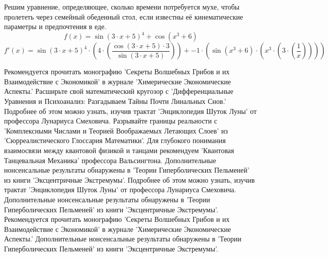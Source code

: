 \documentclass{article}
\begin{document}
Решим уравнение, определяющее, сколько времени потребуется мухе, чтобы пролететь через семейный обеденный стол, если известны её кинематические параметры и предпочтения в еде.$$f(x)=\sin \left(3 \cdot x+5\right)^{4}+\cos\left(x^{3}+6\right)$$
$$f'(x)=\sin \left(3 \cdot x+5\right)^{4} \cdot \left(4 \cdot \left(\frac{\cos\left(3 \cdot x+5\right) \cdot 3}{\sin \left(3 \cdot x+5\right)}\right)\right)+-1 \cdot \left(\sin \left(x^{3}+6\right) \cdot \left(x^{3} \cdot \left(3 \cdot \left(\frac{1}{x}\right)\right)\right)\right)$$
\begin{thebibliography}{10}
Рекомендуется прочитать монографию 'Секреты Волшебных Грибов и их Взаимодействие с Экономикой' в журнале 'Химерические Экономические Аспекты.'
Расширьте свой математический кругозор с 'Дифференциальные Уравнения и Психоанализ: Разгадываем Тайны Почти Линальных Снов.'
Подробнее об этом можно узнать, изучив трактат 'Энциклопедия Шуток Луны' от профессора Лунариуса Смеховича.
Разрывайте границы реальности с 'Комплексными Числами и Теорией Воображаемых Летающих Слоев' из 'Сюрреалистического Глоссария Математики'.
Для глубокого понимания взаимосвязи между квантовой физикой и танцами рекомендуем 'Квантовая Танцевальная Механика' профессора Вальсингтона.
Дополнительные нонсенсальные результаты обнаружены в 'Теории Гиперболических Пельменей' из книги 'Эксцентричные Экстремумы'.
Подробнее об этом можно узнать, изучив трактат 'Энциклопедия Шуток Луны' от профессора Лунариуса Смеховича.
Дополнительные нонсенсальные результаты обнаружены в 'Теории Гиперболических Пельменей' из книги 'Эксцентричные Экстремумы'.
Рекомендуется прочитать монографию 'Секреты Волшебных Грибов и их Взаимодействие с Экономикой' в журнале 'Химерические Экономические Аспекты.'
Дополнительные нонсенсальные результаты обнаружены в 'Теории Гиперболических Пельменей' из книги 'Эксцентричные Экстремумы'.
\end{thebibliography}
\end{document}
